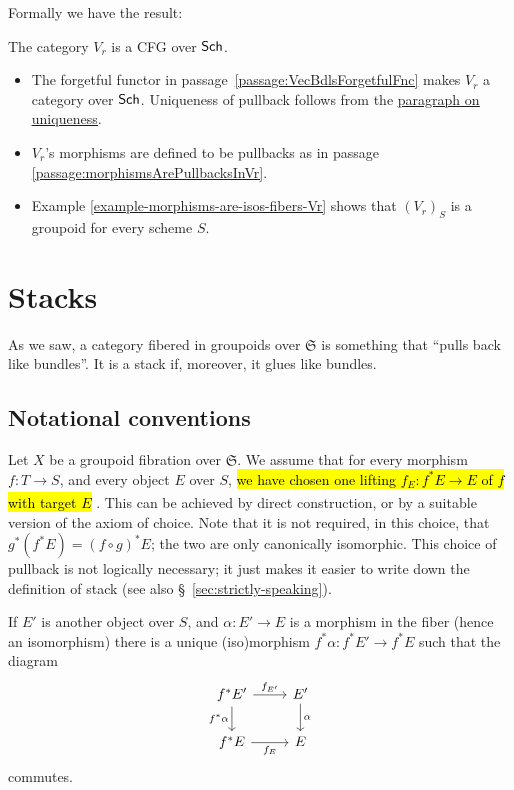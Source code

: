 \documentclass[12pt]{memoir}
\makeatletter
\newcommand{\roundedhighlight}[1]{%
  \begingroup
  \setuloverlap{2pt}%
  \def\SOUL@ulunderline##1{{%
    \setbox\z@\hbox{##1}%
    \rlap{\SOUL@ulcolor{\tikz[overlay,blend mode=darken]{%
      \fill[rounded corners=2pt]
        (-\SOUL@uloverlap,-\SOUL@uldp)
        rectangle (\dimexpr\wd\z@+\SOUL@uloverlap\relax,\SOUL@ulht);%
    }}}%
    \unhcopy\z@
  }}%
  \hl{#1}%
  \endgroup
}
\DeclareRobustCommand{\hlblue}[1]{{\sethlcolor{noteblue}\roundedhighlight{#1}}}
\newcounter{passage}
\newcommand{\passagemark}{%
  \refstepcounter{passage}%
  \textsuperscript{\normalfont[\thepassage]}%
}
\makeatother
\begin{document}
\begin{ptcb}
    Formally we have the result:

    \begin{nonum-Prop}
    The category \(V_r\) is a CFG over \(\mathsf{Sch}\).
    \end{nonum-Prop}

    \begin{itemize}
        \item The forgetful functor in passage~\ref{passage:VecBdlsForgetfulFnc} makes \(V_r\) a category over \(\mathsf{Sch}\). Uniqueness of pullback follows from the \hyperref[para:vector-bundle-pullback-uniqueness]{\underline{paragraph on uniqueness}}.
        \item \(V_r\)'s morphisms are defined to be pullbacks as in passage \ref{passage:morphismsArePullbacksInVr}.
        \item Example \ref{example-morphisms-are-isos-fibers-Vr} shows that \((V_r)_S\) is a groupoid for every scheme \(S\).
    \end{itemize}
\end{ptcb}
\section{Stacks}

As we saw, a category fibered in groupoids over $\mathfrak{S}$ is something that ``pulls back like bundles''. It is a stack if, moreover, it glues like bundles.

\subsection{Notational conventions}

Let $X$ be a groupoid fibration over $\mathfrak{S}$. We assume that for every morphism $f\colon T \to S$, and every object $E$ over $S$, \hlblue{we have chosen one lifting $f_E\colon f^* E \to E$ of $f$ with target $E$}\passagemark\label{passage:uniqueLift}. This can be achieved by direct construction, or by a suitable version of the axiom of choice. Note that it is not required, in this choice, that $g^*(f^* E) = (f \circ g)^* E$; the two are only canonically isomorphic. This choice of pullback is not logically necessary; it just makes it easier to write down the definition of stack (see also \S~\ref{sec:strictly-speaking}).


If $E'$ is another object over $S$, and $\alpha\colon E' \to E$ is a morphism in the fiber (hence an isomorphism) there is a unique (iso)morphism $f^*\alpha\colon f^* E' \to f^* E$ such that the diagram
$$
\begin{tikzcd}
f^*E' \arrow[r, "f_{E'}"] \arrow[d, "f^*\alpha"'] & E' \arrow[d, "\alpha"] \\
f^*E \arrow[r, "f_E"'] & E
\end{tikzcd}
$$
commutes.
\end{document}
